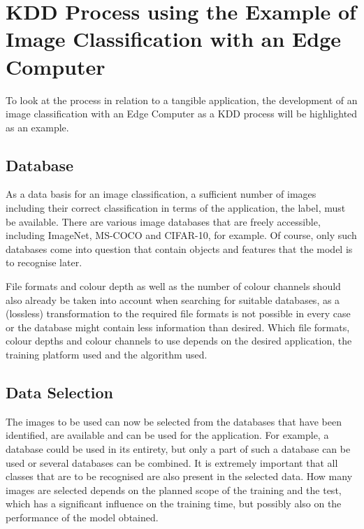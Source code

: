 \section{KDD Process using the Example of Image Classification with an Edge Computer} \label{ExampleKDD}

To look at the process in relation to a tangible application, the development of an image classification with an Edge Computer as a KDD process will be highlighted as an example.

\subsection{Database}


As a data basis for an image classification, a sufficient number of images including their correct classification in terms of the application, the label, must be available. There are various image databases that are freely accessible, including ImageNet, MS-COCO and CIFAR-10, for example. Of course, only such databases come into question that contain objects and features that the model is to recognise later. \cite{Deng:2009,Deng:2012,Schutten:2016,Agarap:2018b} 

File formats and colour depth as well as the number of colour channels should also already be taken into account when searching for suitable databases, as a (lossless) transformation to the required file formats is not possible in every case or the database might contain less information than desired. Which file formats, colour depths and colour channels to use depends on the desired application, the training platform used and the algorithm used.

\subsection{Data Selection}

The images to be used can now be selected from the databases that have been identified, are available and can be used for the application. For example, a database could be used in its entirety, but only a part of such a database can be used or several databases can be combined. It is extremely important that all classes that are to be recognised are also present in the selected data. How many images are selected depends on the planned scope of the training and the test, which has a significant influence on the training time, but possibly also on the performance of the model obtained. 


